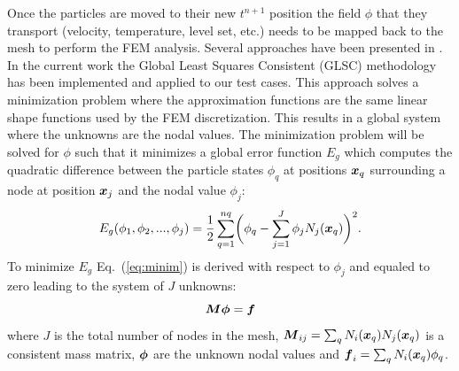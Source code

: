 Once the particles are moved to their new $t^{n+1}$ position the field $\phi$ that they transport (velocity, temperature, level set, etc.) needs to be mapped back to the mesh to perform the FEM analysis. Several approaches have been presented in \cite{gimenez:tesis}. In the current work the Global Least Squares Consistent (GLSC) methodology has been implemented and applied to our test cases. This approach solves a minimization problem where the approximation functions are the same linear shape functions used by the FEM discretization. This results in a global system where the unknowns are the nodal values. The minimization problem will be solved for $\phi$ such that it minimizes a global error function $E_g$ which computes the quadratic difference between the particle states $\phi_q$ at positions $\boldsymbol{x}_q$ surrounding a node at position $\boldsymbol{x}_j$ and the nodal value $\phi_j$:
%
\begin{equation}\label{eq:minim}
  E_g(\phi_1,\phi_2,...,\phi_j)=\frac{1}{2}\sum_{q=1}^{nq} \biggl(\phi_q-\sum_{j=1}^J\phi_jN_j(\boldsymbol{x}_q)\biggr)^2.
\end{equation}
%
To minimize $E_g$ Eq.~(\ref{eq:minim}) is derived with respect to $\phi_j$ and equaled to zero leading to the system of $J$ unknowns:
%
\begin{equation}\label{eq:mapptom}
  \boldsymbol{M}\boldsymbol{\phi}=\boldsymbol{f}
\end{equation}
%
where $J$ is the total number of nodes in the mesh, $\boldsymbol{M}_{ij}=\sum_qN_i(\boldsymbol{x}_q)N_j(\boldsymbol{x}_q)$ is a consistent mass matrix, $\boldsymbol{\phi}$ are the unknown nodal values and $\boldsymbol{f}_i=\sum_qN_i(\boldsymbol{x}_q)\phi_q$.

